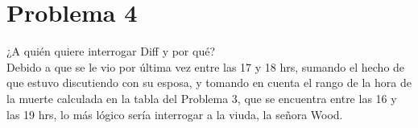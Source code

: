 \section*{Problema 4}
¿A quién quiere interrogar Diff y por qué?\\ 
Debido a que se le vio por última vez entre las 17 y 18 hrs, sumando el hecho de que estuvo discutiendo con su esposa, y tomando en cuenta el rango de la hora de la muerte calculada en la tabla del Problema 3, que se encuentra entre las 16 y las 19 hrs, lo más lógico sería interrogar a la viuda, la señora Wood.